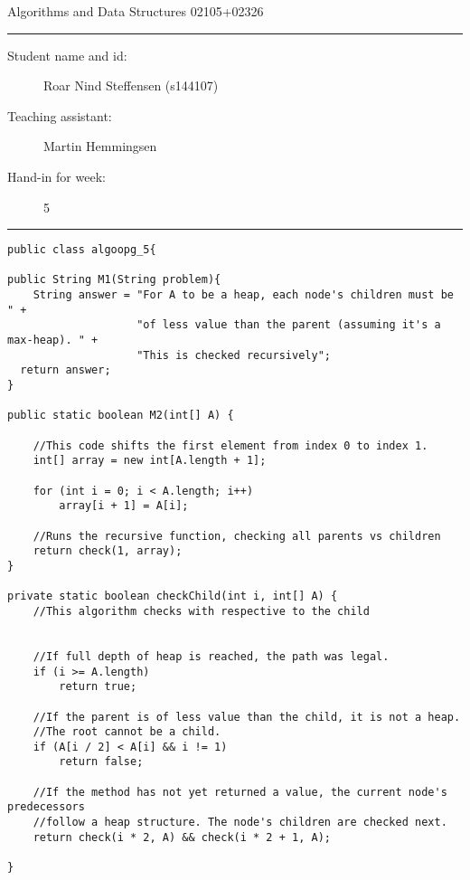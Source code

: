 \documentclass[11pt]{article}
\begin{document}
\begin{center}
{{\Large \sc Algorithms and Data Structures 02105+02326}}
\end{center}
\rule{\textwidth}{1pt}
\begin{description}
\item[Student name and id:] Roar Nind Steffensen (s144107)
\item[Teaching assistant:] Martin Hemmingsen
\item[Hand-in for week:] 5
\end{description}
\rule{\textwidth}{1pt}
 
\hspace{2 cm}

\begin{lstlisting}[style=mystyle]
public class algoopg_5{

public String M1(String problem){
    String answer = "For A to be a heap, each node's children must be " +
                    "of less value than the parent (assuming it's a max-heap). " +
                    "This is checked recursively";
  return answer;
}

public static boolean M2(int[] A) {

    //This code shifts the first element from index 0 to index 1.
    int[] array = new int[A.length + 1];
	
    for (int i = 0; i < A.length; i++)
        array[i + 1] = A[i];
		
    //Runs the recursive function, checking all parents vs children
    return check(1, array);
}

private static boolean checkChild(int i, int[] A) {
    //This algorithm checks with respective to the child


    //If full depth of heap is reached, the path was legal.
    if (i >= A.length)
        return true;

    //If the parent is of less value than the child, it is not a heap.
    //The root cannot be a child.
    if (A[i / 2] < A[i] && i != 1) 
        return false;
    
    //If the method has not yet returned a value, the current node's predecessors
    //follow a heap structure. The node's children are checked next.
    return check(i * 2, A) && check(i * 2 + 1, A);

}


\end{lstlisting}
\end{document}

